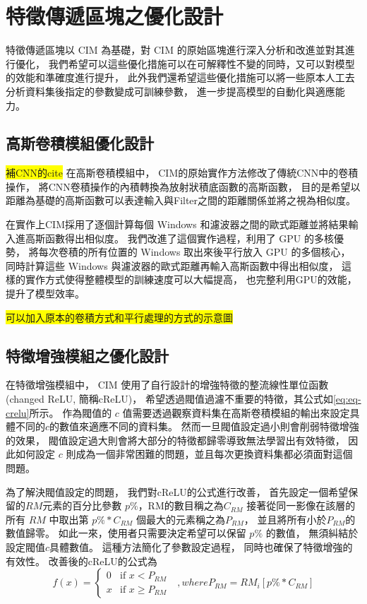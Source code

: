 \documentclass[class=NCU_thesis, crop=false]{standalone}
\begin{document}
\pagebreak
\section{特徵傳遞區塊之優化設計}
\label{chapter:chapter3.4}
特徵傳遞區塊以 CIM 為基礎，對 CIM 的原始區塊進行深入分析和改進並對其進行優化，
我們希望可以這些優化措施可以在可解釋性不變的同時，又可以對模型的效能和準確度進行提升，
此外我們還希望這些優化措施可以將一些原本人工去分析資料集後指定的參數變成可訓練參數，
進一步提高模型的自動化與適應能力。

	\subsection{高斯卷積模組優化設計}

	\colorbox {yellow}{補CNN的cite}
	在高斯卷積模組中，
	CIM的原始實作方法修改了傳統CNN\cite{}中的卷積操作，
	將CNN卷積操作的內積轉換為放射狀積底函數的高斯函數，
	目的是希望以距離為基礎的高斯函數可以表達輸入與Filter之間的距離關係並將之視為相似度。

	在實作上CIM採用了逐個計算每個 Windows 和濾波器之間的歐式距離並將結果輸入進高斯函數得出相似度。
	我們改進了這個實作過程，利用了 GPU 的多核優勢，
	將每次卷積的所有位置的 Windows 取出來後平行放入 GPU 的多個核心，
	同時計算這些 Windows 與濾波器的歐式距離再輸入高斯函數中得出相似度，
	這樣的實作方式使得整體模型的訓練速度可以大幅提高，
	也完整利用GPU的效能，提升了模型效率。

	\colorbox {yellow}{可以加入原本的卷積方式和平行處理的方式的示意圖}

	\subsection{特徵增強模組之優化設計}
	在特徵增強模組中，
	CIM 使用了自行設計的增強特徵的整流線性單位函數(changed ReLU, 簡稱cReLU)，
	希望透過閥值過濾不重要的特徵，其公式如\cref{eq:eq-crelu}所示。
	作為閥值的 $c$ 值需要透過觀察資料集在高斯卷積模組的輸出來設定具體不同的$c$的數值來適應不同的資料集。
	然而一旦閥值設定過小則會削弱特徵增強的效果，
	閥值設定過大則會將大部分的特徵都歸零導致無法學習出有效特徵，
	因此如何設定 $c$ 則成為一個非常困難的問題，並且每次更換資料集都必須面對這個問題。

	為了解決閥值設定的問題，
	我們對cReLU的公式進行改善，
	首先設定一個希望保留的$RM$元素的百分比參數 $p\%$，RM的數目稱之為$C_{RM}$
	接著從同一影像在該層的所有 $RM$ 中取出第 $p\% * C_{RM}$  個最大的元素稱之為$P_{RM}$，
	並且將所有小於$P_{RM}$的數值歸零。
	如此一來，使用者只需要決定希望可以保留 $p\%$ 的數值，
	無須糾結於設定閥值$c$具體數值。
	這種方法簡化了參數設定過程，
	同時也確保了特徵增強的有效性。
	改善後的cReLU的公式為\\
	\begin{equation}
	    \label{eq:eq-cReLUPercent}
	    f(x)= 
	    \begin{cases}
	        0 & \text{if  $x < P_{RM}$ }\\
	        x & \text{if  $x \geq P_{RM}$}
	    \end{cases}, where P_{RM} = RM_{i}\left[ p\% * C_{RM} \right]
	\end{equation}
\end{document}
